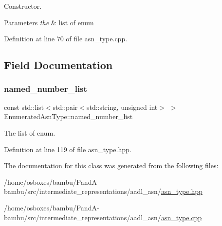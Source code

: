 Constructor. 


\begin{DoxyParams}{Parameters}
{\em the} & list of enum \\
\hline
\end{DoxyParams}


Definition at line 70 of file asn\+\_\+type.\+cpp.



\subsection{Field Documentation}
\mbox{\label{classEnumeratedAsnType_a7393f9a5ef4fe7295453e1eb16b3607a}} 
\subsubsection{\texorpdfstring{named\+\_\+number\+\_\+list}{named\_number\_list}}
{\footnotesize\ttfamily const std\+::list$<$std\+::pair$<$std\+::string, unsigned int$>$ $>$ Enumerated\+Asn\+Type\+::named\+\_\+number\+\_\+list}



The list of enum. 



Definition at line 119 of file asn\+\_\+type.\+hpp.



The documentation for this class was generated from the following files\+:\begin{DoxyCompactItemize}
\item 
/home/osboxes/bambu/\+Pand\+A-\/bambu/src/intermediate\+\_\+representations/aadl\+\_\+asn/\hyperlink{asn__type_8hpp}{asn\+\_\+type.\+hpp}\item 
/home/osboxes/bambu/\+Pand\+A-\/bambu/src/intermediate\+\_\+representations/aadl\+\_\+asn/\hyperlink{asn__type_8cpp}{asn\+\_\+type.\+cpp}\end{DoxyCompactItemize}
